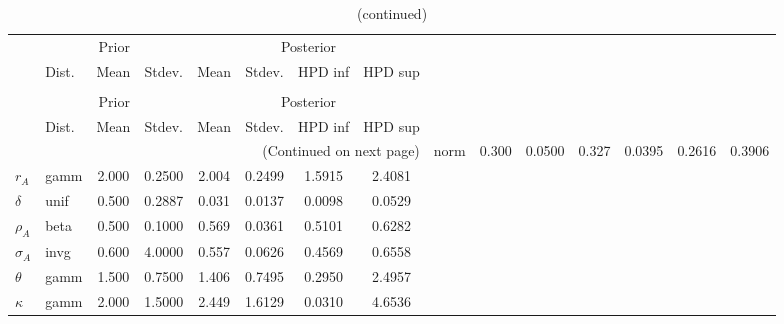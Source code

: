  
\begin{center}
\begin{longtable}{llcccccc} 
\caption{Results from Metropolis-Hastings (parameters)}
 \label{Table:MHPosterior:1}\\
\toprule 
  & \multicolumn{3}{c}{Prior}  &  \multicolumn{4}{c}{Posterior} \\
  \cmidrule(r{.75em}){2-4} \cmidrule(r{.75em}){5-8}
  & Dist. & Mean  & Stdev. & Mean & Stdev. & HPD inf & HPD sup\\
\midrule \endfirsthead 
\caption{(continued)}\\\toprule 
  & \multicolumn{3}{c}{Prior}  &  \multicolumn{4}{c}{Posterior} \\
  \cmidrule(r{.75em}){2-4} \cmidrule(r{.75em}){5-8}
  & Dist. & Mean  & Stdev. & Mean & Stdev. & HPD inf & HPD sup\\
\midrule \endhead 
\bottomrule \multicolumn{8}{r}{(Continued on next page)} \endfoot 
\bottomrule \endlastfoot 
${\alpha}$ & norm &   0.300 & 0.0500 &   0.327& 0.0395 &  0.2616 &  0.3906 \\ 
${r_{A}}$ & gamm &   2.000 & 0.2500 &   2.004& 0.2499 &  1.5915 &  2.4081 \\ 
${\delta}$ & unif &   0.500 & 0.2887 &   0.031& 0.0137 &  0.0098 &  0.0529 \\ 
${\rho_A}$ & beta &   0.500 & 0.1000 &   0.569& 0.0361 &  0.5101 &  0.6282 \\ 
${\sigma_A}$ & invg &   0.600 & 4.0000 &   0.557& 0.0626 &  0.4569 &  0.6558 \\ 
${\theta}$ & gamm &   1.500 & 0.7500 &   1.406& 0.7495 &  0.2950 &  2.4957 \\ 
${\kappa}$ & gamm &   2.000 & 1.5000 &   2.449& 1.6129 &  0.0310 &  4.6536 \\ 
\end{longtable}
 \end{center}
